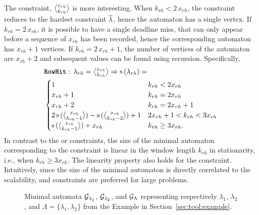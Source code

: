 The \tRH{} constraint, $\rowhit{rh}$ is more interesting.
When $k_{rh} < 2\,x_{rh}$, the constraint reduces to the hardest constraint $\overline{\lambda}$, hence the automaton has a single vertex.
If $k_{rh} = 2\,x_{rh}$, it is possible to have a single deadline miss, that can only appear before a sequence of $x_{rh}$ has been recorded, hence the corresponding automaton has $x_{rh} + 1$ vertices.
If $k_{rh} = 2\,x_{rh} + 1$, the number of vertices of the automaton are $x_{rh} + 2$ and subsequent values can be found using recursion.
Specifically,
\begin{equation*}
    \begin{aligned}
        & \tRH{}: \, \lambda_{rh} = \textstyle\rowhit{rh} \Rightarrow \mathrm{s}\left(\lambda_{rh}\right) = \\
        & \begin{cases}
            1 & k_{rh} < 2x_{rh} \\
            x_{rh}+1 & k_{rh} = 2x_{rh} \\
            x_{rh}+2 & k_{rh} = 2x_{rh}+1 \\
            2\, \mathrm{s}\,(\textstyle \genfrac{<}{>}{0pt}{}{x_{rh}}{k_{rh}-1} ) - 
                \mathrm{s}\,(\textstyle \genfrac{<}{>}{0pt}{}{x_{rh}}{k_{rh}-2} ) + 1 & 2x_{rh} + 1 < k_{rh} < 3x_{rh} \\
            \mathrm{s}\,(\textstyle \genfrac{<}{>}{0pt}{}{x_{rh}}{k_{rh}-1} ) + x_{rh} &k_{rh} \geq 3x_{rh}. \\
        \end{cases}
    \end{aligned}
\end{equation*}
%
In contrast to the \tAH{} or \tAM{} constraints, the size of the minimal automaton corresponding to the \tRH{} constraint is linear in the window length $k_{rh}$ in stationarity, i.e., when $k_{rh} \geq 3x_{rh}$.
The linearity property also holds for the \tRM{} constraint.
Intuitively, since the size of the minimal automaton is directly correlated to the scalability, \tRH{} and \tRM{} constraints are preferred for large problems.

\begin{figure*}[t]
    \centering
    
    \caption{Minimal automata $\mathcal{G}_{\lambda_1}$, $\mathcal{G}_{\lambda_2}$, and $\mathcal{G}_{\Lambda}$ representing respectively $\lambda_1$, $\lambda_2$, and $\Lambda = \{\lambda_1, \lambda_2\}$ from the Example in Section~\ref{sec:tool:example}.}%
    \label{fig:dominant-set}
\end{figure*}

